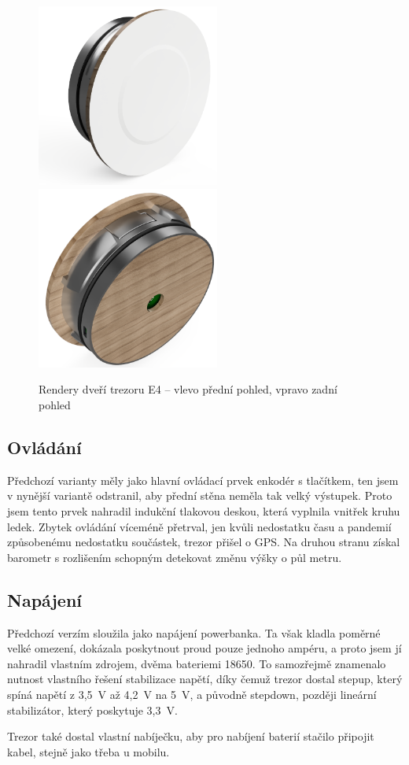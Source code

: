 \begin{figure}[htbp]
    \centering
    \includegraphics[width=170pt]{kapitoly/obrazky/E4/predni_render.png}
    \includegraphics[width=170pt]{kapitoly/obrazky/E4/zadni_render.png}
    \caption{Rendery dveří trezoru E4 -- vlevo přední pohled, vpravo zadní pohled 	\centering}
    \label{fig:E4-render}
\end{figure}


\subsection{Ovládání}
Předchozí varianty měly jako hlavní ovládací prvek enkodér s tlačítkem, ten jsem v nynější variantě odstranil, aby přední stěna neměla tak velký 
výstupek. Proto jsem tento prvek nahradil indukční tlakovou deskou, která vyplnila vnitřek kruhu ledek. 
Zbytek ovládání víceméně přetrval, jen kvůli nedostatku času a pandemií způsobenému nedostatku součástek, trezor přišel o GPS. Na druhou stranu 
získal barometr s rozlišením schopným detekovat změnu výšky o půl metru.

\subsection{Napájení}
Předchozí verzím sloužila jako napájení powerbanka. Ta však kladla poměrné velké omezení, dokázala poskytnout proud pouze jednoho ampéru, a proto 
jsem jí nahradil vlastním zdrojem, dvěma bateriemi 18650. 
To  samozřejmě znamenalo nutnost vlastního řešení stabilizace napětí, díky čemuž 
trezor dostal stepup, který spíná napětí z 3,5~V až 4,2~V na 5~V, a původně stepdown, později lineární stabilizátor, který poskytuje 3,3~V. 

Trezor také dostal vlastní nabíječku, aby pro nabíjení baterií stačilo připojit kabel, stejně jako třeba u mobilu.

